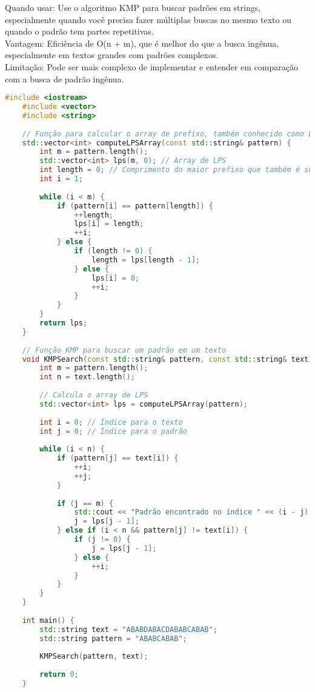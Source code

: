 \documentclass{article}
\begin{document}
Quando usar: Use o algoritmo KMP para buscar padrões em strings, especialmente quando você precisa fazer múltiplas buscas no mesmo texto ou quando o padrão tem partes repetitivas.
\\Vantagem: Eficiência de O(n + m), que é melhor do que a busca ingênua, especialmente em textos grandes com padrões complexos.
\\Limitação: Pode ser mais complexo de implementar e entender em comparação com a busca de padrão ingênua.

\begin{lstlisting}[language=C++, caption=KMP]
    #include <iostream>
    #include <vector>
    #include <string>
    
    // Função para calcular o array de prefixo, também conhecido como LPS (Longest Prefix Suffix)
    std::vector<int> computeLPSArray(const std::string& pattern) {
        int m = pattern.length();
        std::vector<int> lps(m, 0); // Array de LPS
        int length = 0; // Comprimento do maior prefixo que também é sufixo
        int i = 1;
    
        while (i < m) {
            if (pattern[i] == pattern[length]) {
                ++length;
                lps[i] = length;
                ++i;
            } else {
                if (length != 0) {
                    length = lps[length - 1];
                } else {
                    lps[i] = 0;
                    ++i;
                }
            }
        }
        return lps;
    }
    
    // Função KMP para buscar um padrão em um texto
    void KMPSearch(const std::string& pattern, const std::string& text) {
        int m = pattern.length();
        int n = text.length();
    
        // Calcula o array de LPS
        std::vector<int> lps = computeLPSArray(pattern);
    
        int i = 0; // Índice para o texto
        int j = 0; // Índice para o padrão
    
        while (i < n) {
            if (pattern[j] == text[i]) {
                ++i;
                ++j;
            }
    
            if (j == m) {
                std::cout << "Padrão encontrado no índice " << (i - j) << std::endl;
                j = lps[j - 1];
            } else if (i < n && pattern[j] != text[i]) {
                if (j != 0) {
                    j = lps[j - 1];
                } else {
                    ++i;
                }
            }
        }
    }
    
    int main() {
        std::string text = "ABABDABACDABABCABAB";
        std::string pattern = "ABABCABAB";
    
        KMPSearch(pattern, text);
    
        return 0;
    }
    
\end{lstlisting}
\end{document}
